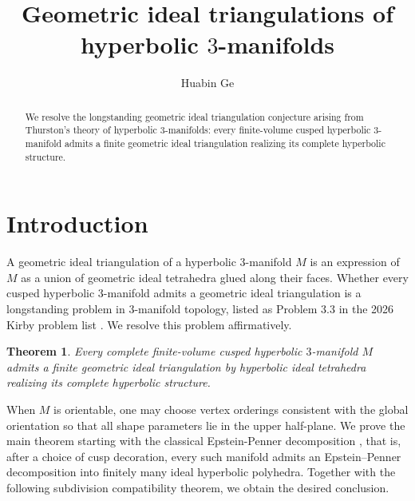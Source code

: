 \documentclass[oneside,a4paper,12pt]{article}
\renewcommand{\H}{\mathbb{H}}
\theoremstyle{plain}
\newtheorem{theorem}{Theorem}[section]
\theoremstyle{definition}
\theoremstyle{remark}
\numberwithin{equation}{section}
\begin{document}
\title{\textbf{Geometric ideal triangulations of hyperbolic $3$-manifolds}}
\author{Huabin Ge}
\date{}
\maketitle

\begin{abstract}
We resolve the longstanding geometric ideal triangulation conjecture arising from Thurston's theory of hyperbolic $3$-manifolds: every finite-volume cusped hyperbolic $3$-manifold admits a finite geometric ideal triangulation realizing its complete hyperbolic structure.
\end{abstract}

\section{Introduction}\label{section:introduction}
A geometric ideal triangulation of a hyperbolic 3-manifold $M$ is an expression of $M$ as a union of geometric ideal tetrahedra glued along their faces. %
Whether every cusped hyperbolic $3$-manifold admits a geometric ideal triangulation is a longstanding problem in $3$-manifold topology, listed as Problem 3.3
in the 2026 Kirby problem list \cite{KirbyK3}. We resolve this problem affirmatively.

\begin{theorem}\label{main}
Every complete finite-volume cusped hyperbolic $3$-manifold $M$ admits a finite geometric ideal triangulation by hyperbolic ideal tetrahedra realizing its complete hyperbolic structure.
\end{theorem}

When $M$ is orientable, one may choose vertex orderings consistent with the global orientation so that all shape parameters lie in the upper half-plane. We prove the main theorem starting with the classical Epstein-Penner decomposition \cite{EP}, that is, after a choice of cusp decoration, every such manifold admits an Epstein--Penner decomposition into finitely many ideal hyperbolic polyhedra. Together with the following subdivision compatibility theorem, we obtain the desired conclusion.
\end{document}
